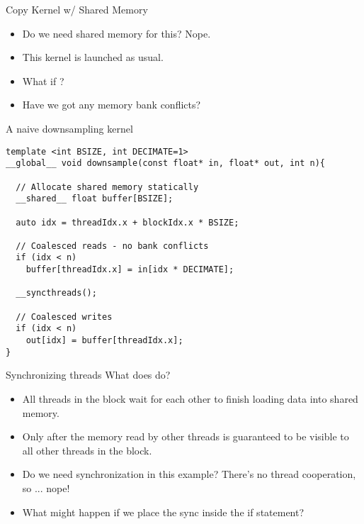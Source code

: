 \documentclass[aspectratio=43]{beamer}
\begin{document}
\begin{frame}[fragile]{Copy Kernel w/ Shared Memory}
    \begin{itemize}
        \item Do we need shared memory for this? Nope.
        \item This kernel is launched as usual.
        \item What if ?
        \item Have we got any memory bank conflicts?
    \end{itemize}

    \begin{code}{A naive downsampling kernel}
        \begin{lstlisting}[style=boxcudatiny]
template <int BSIZE, int DECIMATE=1>
__global__ void downsample(const float* in, float* out, int n){

  // Allocate shared memory statically
  __shared__ float buffer[BSIZE];

  auto idx = threadIdx.x + blockIdx.x * BSIZE;

  // Coalesced reads - no bank conflicts
  if (idx < n)
    buffer[threadIdx.x] = in[idx * DECIMATE];

  __syncthreads();

  // Coalesced writes
  if (idx < n)
    out[idx] = buffer[threadIdx.x];
}
        \end{lstlisting}
    \end{code}

\end{frame}

\begin{frame}[fragile]{Synchronizing threads}
    What does  do?
    
    \begin{itemize}
        \item All threads in the block wait for each other to finish loading data into shared memory.
        \item Only after  the memory read by other threads is guaranteed to be visible to all other threads in the block.
        \item Do we need synchronization in this example? There's no thread cooperation, so ... nope!
        \item What might happen if we place the sync inside the if statement?
        
    \end{itemize}
\end{frame}
\end{document}
